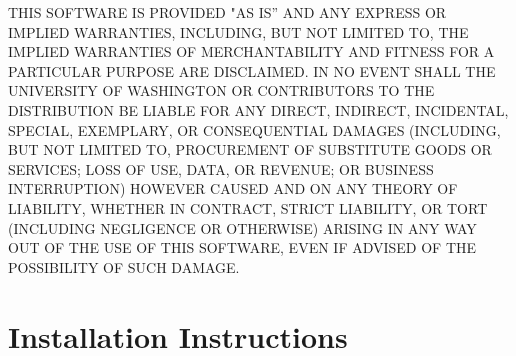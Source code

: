 \documentclass[11pt,oneside]{report} %
\newcommand{\feffcurrent}{\textsc{feff10}}
\newcommand{\program}[1]{\textsc{#1}}
\newcommand{\feff}{\program{feff}}
\begin{document}
\begin{latexonly}
THIS SOFTWARE IS PROVIDED "AS IS'' AND ANY EXPRESS OR IMPLIED
WARRANTIES, INCLUDING, BUT NOT LIMITED TO, THE IMPLIED WARRANTIES OF
MERCHANTABILITY AND FITNESS FOR A PARTICULAR PURPOSE ARE DISCLAIMED.
IN NO EVENT SHALL THE UNIVERSITY OF WASHINGTON OR CONTRIBUTORS TO THE
DISTRIBUTION BE LIABLE FOR ANY DIRECT, INDIRECT, INCIDENTAL, SPECIAL,
EXEMPLARY, OR CONSEQUENTIAL DAMAGES (INCLUDING, BUT NOT LIMITED TO,
PROCUREMENT OF SUBSTITUTE GOODS OR SERVICES; LOSS OF USE, DATA, OR
REVENUE; OR BUSINESS INTERRUPTION) HOWEVER CAUSED AND ON ANY THEORY OF
LIABILITY, WHETHER IN CONTRACT, STRICT LIABILITY, OR TORT (INCLUDING
NEGLIGENCE OR OTHERWISE) ARISING IN ANY WAY OUT OF THE USE OF THIS
SOFTWARE, EVEN IF ADVISED OF THE POSSIBILITY OF SUCH DAMAGE.



\chapter{Installation Instructions}
\label{sec:Append-B-Inst}


  


\end{latexonly}
\end{document}

